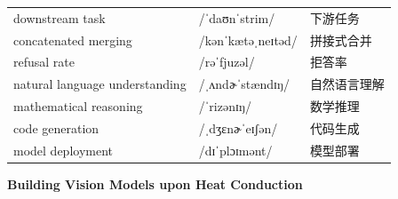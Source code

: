 \documentclass[UTF8,12pt,a4paper]{ctexart}
\providecommand{\zh}[1]{#1}
\begin{document}
\begin{tabular*}{\textwidth}{@{\extracolsep{\fill}}lll@{}}
downstream task & {\ipafont /ˈdaʊnˈstrim/} & \zh{下游任务} \\
concatenated merging & {\ipafont /kənˈkætəˌneɪtəd/} & \zh{拼接式合并} \\
refusal rate & {\ipafont /rəˈfjuzəl/} & \zh{拒答率} \\
natural language understanding & {\ipafont /ˌʌndɚˈstændɪŋ/} & \zh{自然语言理解} \\
mathematical reasoning & {\ipafont /ˈrizənɪŋ/} & \zh{数学推理} \\
code generation & {\ipafont /ˌdʒɛnɚˈeɪʃən/} & \zh{代码生成} \\
model deployment & {\ipafont /dɪˈplɔɪmənt/} & \zh{模型部署} \\
\bottomrule
\end{tabular*}

\newpage

\begin{center}
    {\Large\bfseries Building Vision Models upon Heat Conduction}
\end{center}
\end{document}

